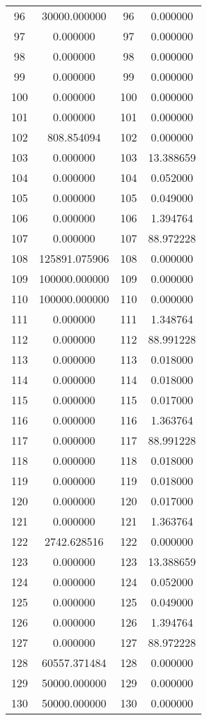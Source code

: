 \documentclass[12pt]{article}
\begin{document}
\begin{longtable}{@{}cccc@{}}
96 & 30000.000000 & 96 & 0.000000 \\
97 & 0.000000 & 97 & 0.000000 \\
98 & 0.000000 & 98 & 0.000000 \\
99 & 0.000000 & 99 & 0.000000 \\
100 & 0.000000 & 100 & 0.000000 \\
101 & 0.000000 & 101 & 0.000000 \\
102 & 808.854094 & 102 & 0.000000 \\
103 & 0.000000 & 103 & 13.388659 \\
104 & 0.000000 & 104 & 0.052000 \\
105 & 0.000000 & 105 & 0.049000 \\
106 & 0.000000 & 106 & 1.394764 \\
107 & 0.000000 & 107 & 88.972228 \\
108 & 125891.075906 & 108 & 0.000000 \\
109 & 100000.000000 & 109 & 0.000000 \\
110 & 100000.000000 & 110 & 0.000000 \\
111 & 0.000000 & 111 & 1.348764 \\
112 & 0.000000 & 112 & 88.991228 \\
113 & 0.000000 & 113 & 0.018000 \\
114 & 0.000000 & 114 & 0.018000 \\
115 & 0.000000 & 115 & 0.017000 \\
116 & 0.000000 & 116 & 1.363764 \\
117 & 0.000000 & 117 & 88.991228 \\
118 & 0.000000 & 118 & 0.018000 \\
119 & 0.000000 & 119 & 0.018000 \\
120 & 0.000000 & 120 & 0.017000 \\
121 & 0.000000 & 121 & 1.363764 \\
122 & 2742.628516 & 122 & 0.000000 \\
123 & 0.000000 & 123 & 13.388659 \\
124 & 0.000000 & 124 & 0.052000 \\
125 & 0.000000 & 125 & 0.049000 \\
126 & 0.000000 & 126 & 1.394764 \\
127 & 0.000000 & 127 & 88.972228 \\
128 & 60557.371484 & 128 & 0.000000 \\
129 & 50000.000000 & 129 & 0.000000 \\
130 & 50000.000000 & 130 & 0.000000 \\

\end{longtable}
\end{document}
